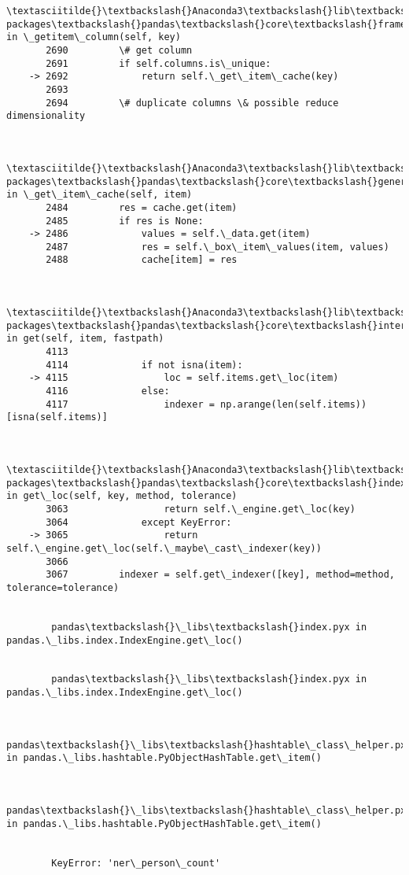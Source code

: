 \documentclass[11pt]{article}
\begin{document}
\begin{Verbatim}[commandchars=\\\{\}]
        \textasciitilde{}\textbackslash{}Anaconda3\textbackslash{}lib\textbackslash{}site-packages\textbackslash{}pandas\textbackslash{}core\textbackslash{}frame.py in \_getitem\_column(self, key)
       2690         \# get column
       2691         if self.columns.is\_unique:
    -> 2692             return self.\_get\_item\_cache(key)
       2693 
       2694         \# duplicate columns \& possible reduce dimensionality
    

        \textasciitilde{}\textbackslash{}Anaconda3\textbackslash{}lib\textbackslash{}site-packages\textbackslash{}pandas\textbackslash{}core\textbackslash{}generic.py in \_get\_item\_cache(self, item)
       2484         res = cache.get(item)
       2485         if res is None:
    -> 2486             values = self.\_data.get(item)
       2487             res = self.\_box\_item\_values(item, values)
       2488             cache[item] = res
    

        \textasciitilde{}\textbackslash{}Anaconda3\textbackslash{}lib\textbackslash{}site-packages\textbackslash{}pandas\textbackslash{}core\textbackslash{}internals.py in get(self, item, fastpath)
       4113 
       4114             if not isna(item):
    -> 4115                 loc = self.items.get\_loc(item)
       4116             else:
       4117                 indexer = np.arange(len(self.items))[isna(self.items)]
    

        \textasciitilde{}\textbackslash{}Anaconda3\textbackslash{}lib\textbackslash{}site-packages\textbackslash{}pandas\textbackslash{}core\textbackslash{}indexes\textbackslash{}base.py in get\_loc(self, key, method, tolerance)
       3063                 return self.\_engine.get\_loc(key)
       3064             except KeyError:
    -> 3065                 return self.\_engine.get\_loc(self.\_maybe\_cast\_indexer(key))
       3066 
       3067         indexer = self.get\_indexer([key], method=method, tolerance=tolerance)
    

        pandas\textbackslash{}\_libs\textbackslash{}index.pyx in pandas.\_libs.index.IndexEngine.get\_loc()
    

        pandas\textbackslash{}\_libs\textbackslash{}index.pyx in pandas.\_libs.index.IndexEngine.get\_loc()
    

        pandas\textbackslash{}\_libs\textbackslash{}hashtable\_class\_helper.pxi in pandas.\_libs.hashtable.PyObjectHashTable.get\_item()
    

        pandas\textbackslash{}\_libs\textbackslash{}hashtable\_class\_helper.pxi in pandas.\_libs.hashtable.PyObjectHashTable.get\_item()
    

        KeyError: 'ner\_person\_count'

    \end{Verbatim}
\end{document}
